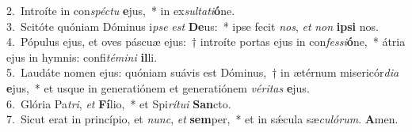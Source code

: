 {2.~}Introíte in con\textit{spé}\textit{ctu} \textbf{e}jus,~* in ex\textit{sul}\textit{ta}\textit{ti}\textbf{ó}ne.\\
{3.~}Scitóte quóniam Dóminus i\textit{pse} \textit{est} \textbf{De}us:~* ipse fecit \textit{nos}, \textit{et} \textit{non} \textbf{i}\textbf{psi} nos.\\
{4.~}Pópulus ejus, et oves páscuæ ejus:~† introíte portas ejus in con\textit{fes}\textit{si}\textbf{ó}ne,~* átria ejus in hymnis: confi\textit{té}\textit{mi}\textit{ni} \textbf{il}li.\\
{5.~}Laudáte nomen ejus: quóniam suávis est Dóminus,~† in ætérnum misericór\textit{di}\textit{a} \textbf{e}jus,~* et usque in generatiónem et generatiónem \textit{vé}\textit{ri}\textit{tas} \textbf{e}jus.\\
{6.~}Glória Pa\textit{tri}, \textit{et} \textbf{Fí}lio,~* et Spi\textit{rí}\textit{tu}\textit{i} \textbf{San}cto.\\
{7.~}Sicut erat in princípio, et \textit{nunc}, \textit{et} \textbf{sem}per,~* et in sǽcula sæ\textit{cu}\textit{ló}\textit{rum}. \textbf{A}men.\\

